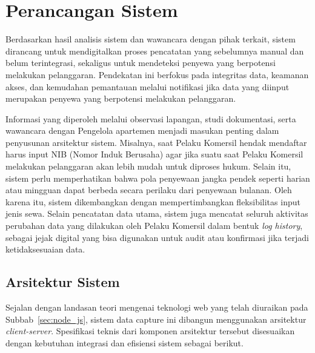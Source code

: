 \section{Perancangan Sistem}

Berdasarkan hasil analisis sistem dan wawancara dengan pihak terkait, sistem dirancang untuk mendigitalkan proses pencatatan yang sebelumnya manual dan belum terintegrasi, sekaligus untuk mendeteksi penyewa yang berpotensi melakukan pelanggaran. Pendekatan ini berfokus pada integritas data, keamanan akses, dan kemudahan pemantauan melalui notifikasi jika data yang diinput merupakan penyewa yang berpotensi melakukan pelanggaran.

Informasi yang diperoleh melalui observasi lapangan, studi dokumentasi, serta wawancara dengan Pengelola apartemen menjadi masukan penting dalam penyusunan arsitektur sistem. Misalnya, saat Pelaku Komersil hendak mendaftar harus input NIB (Nomor Induk Berusaha) agar jika suatu saat Pelaku Komersil melakukan pelanggaran akan lebih mudah untuk diproses hukum. Selain itu, sistem perlu memperhatikan bahwa pola penyewaan jangka pendek seperti harian atau mingguan dapat berbeda secara perilaku dari penyewaan bulanan. Oleh karena itu, sistem dikembangkan dengan mempertimbangkan fleksibilitas input jenis sewa. Selain pencatatan data utama, sistem juga mencatat seluruh aktivitas perubahan data yang dilakukan oleh Pelaku Komersil dalam bentuk \textit{log history}, sebagai jejak digital yang bisa digunakan untuk audit atau konfirmasi jika terjadi ketidaksesuaian data.

\subsection{Arsitektur Sistem}
Sejalan dengan landasan teori mengenai teknologi web yang telah diuraikan pada Subbab~\ref{sec:node_js}, sistem {data capture} ini dibangun menggunakan arsitektur \textit{client-server}. Spesifikasi teknis dari komponen arsitektur tersebut disesuaikan dengan kebutuhan integrasi dan efisiensi sistem sebagai berikut.

